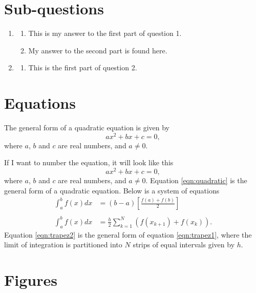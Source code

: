\documentclass[12pt,a4paper]{article}
\begin{document}
\section{Sub-questions}
\begin{enumerate}
\item 
\begin{enumerate}
\item This is my answer to the first part of question 1.
\item My answer to the second part is found here.
\end{enumerate}
\item 
\begin{enumerate}
\item This is the first part of question 2.
\end{enumerate}
\end{enumerate}

\section{Equations}
The general form of a quadratic equation is given by $$ax^{2} + bx + c = 0,$$ where $a$, $b$ and $c$ are real numbers, and $a\neq 0$.

If I want to number the equation, it will look like this
\begin{equation}
\label{eqn:quadratic}
ax^{2} + bx + c = 0,
\end{equation}
where $a$, $b$ and $c$ are real numbers, and $a\neq 0$. Equation \eqref{eqn:quadratic} is the general form of a quadratic equation. Below is a system of equations
\begin{align}
\label{eqn:trapez1}
\int _{a}^{b}f(x)dx &= (b-a)\left[ \frac{f(a) + f(b)}{2} \right] \\
\nonumber\\
\label{eqn:trapez2}
\int _{a}^{b}f(x)dx &= \frac{h}{2}\sum _{k=1} ^{N} \left( f(x_{k+1}) + f(x_{k}) \right).
\end{align}
Equation \eqref{eqn:trapez2} is the general form of equation \eqref{eqn:trapez1}, where the limit of integration is partitioned into $N$ strips of equal intervals given by $h$.

%

\section{Figures}
\end{document}

